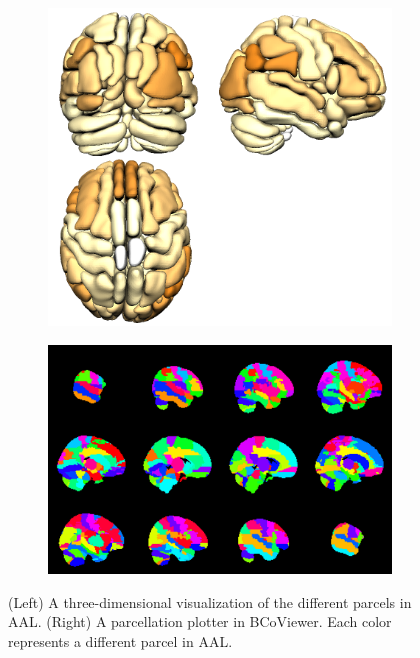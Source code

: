 \documentclass{nature}
\begin{document}
\begin{figure}
\centering
\begin{subfigure}{.5\textwidth}
  \centering
  \includegraphics[width=.9\linewidth]{fig/brainconductor/AAL_all.png}
\end{subfigure}%
\begin{subfigure}{.5\textwidth}
  \centering
 
\includegraphics[width=.9\linewidth]{fig/brainconductor/partition_aal_sagittal_2016-04-11.png}
\end{subfigure}
\caption{(Left) A three-dimensional visualization of the different parcels in
AAL. (Right) A parcellation plotter in BCoViewer. Each color represents a
different parcel in AAL.}
\label{fig:aal}
\end{figure}
\end{document}
